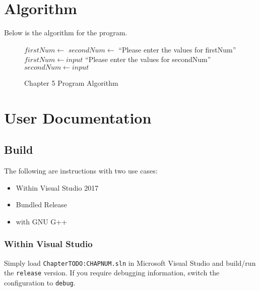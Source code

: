 \documentclass[a4paper,11pt]{article}
\begin{document}
  \newpage
  \section{Algorithm}
    Below is the algorithm for the program.
    \begin{figure}[h]
      \caption{Chapter 5 Program Algorithm}
      \vspace{12pt}
      \begin{algorithmic}
        \State {}
        \State 
        \State $firstNum\gets $
        \State $secondNum\gets $
        \State {}
        \State {} ``Please enter the values for firstNum''
          \State $firstNum\gets input$
        \State {} ``Please enter the values for secondNum''
          \State $secondNum\gets input$
      \end{algorithmic}
      \label{alg:c5}
    \end{figure}


  \newpage
  \section{User Documentation}

    \subsection{Build}
      The following are instructions with two use cases:
      \begin{itemize}
        \item Within Visual Studio 2017
        \item Bundled Release
        \item with GNU G++
      \end{itemize}
      \subsubsection{Within Visual Studio}
        Simply load \texttt{ChapterTODO:CHAPNUM.sln} in Microsoft Visual Studio and 
          build/run the \texttt{release} version. If you require debugging
          information, switch the configuration to \texttt{debug}.
\end{document}
